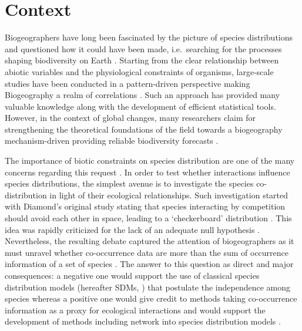 \section{Context}\label{context}

Biogeographers have long been fascinated by the picture of species
distributions and questioned how it could have been made, i.e.~searching
for the processes shaping biodiversity on Earth
\citep{Engelbrecht2007, Tittensor2010}. Starting from the clear
relationship between abiotic variables and the physiological constraints
of organisms, large-scale studies have been conducted in a
pattern-driven perspective making Biogeography a realm of correlations
\citep{Gaston2000}. Such an approach has provided many valuable
knowledge along with the development of efficient statistical tools.
However, in the context of global changes, many researchers claim for
strengthening the theoretical foundations of the field towards a
biogeography mechanism-driven providing reliable biodiversity forecasts
\citep{Lomolino2000, Thuiller2013, Violle2014}.

The importance of biotic constraints on species distribution are one of
the many concerns regarding this request \citep{Godsoe2012, Araujo2014}.
In order to test whether interactions influence species distributions,
the simplest avenue is to investigate the species co-distribution in
light of their ecological relationships. Such investigation started with
Diamond's original study stating that species interacting by competition
should avoid each other in space, leading to a `checkerboard'
distribution \citep{Diamond1975}. This idea was rapidly criticized for
the lack of an adequate null hypothesis \citep{Connor1979, Gilpin1982}.
Nevertheless, the resulting debate captured the attention of
biogeographers as it must unravel whether co-occurrence data are more
than the sum of occurrence information of a set of species
\citep{Clark2014}. The answer to this question as direct and major
consequences: a negative one would support the use of classical species
distribution models (hereafter SDMs, \citet{Elith2009}) that postulate
the independence among species whereas a positive one would give credit
to methods taking co-occurrence information as a proxy for ecological
interactions \citep{Morales-Castilla2015} and would support the
development of methods including network into species distribution
models \citep{Ovaskainen2010, Pollock2014}.

